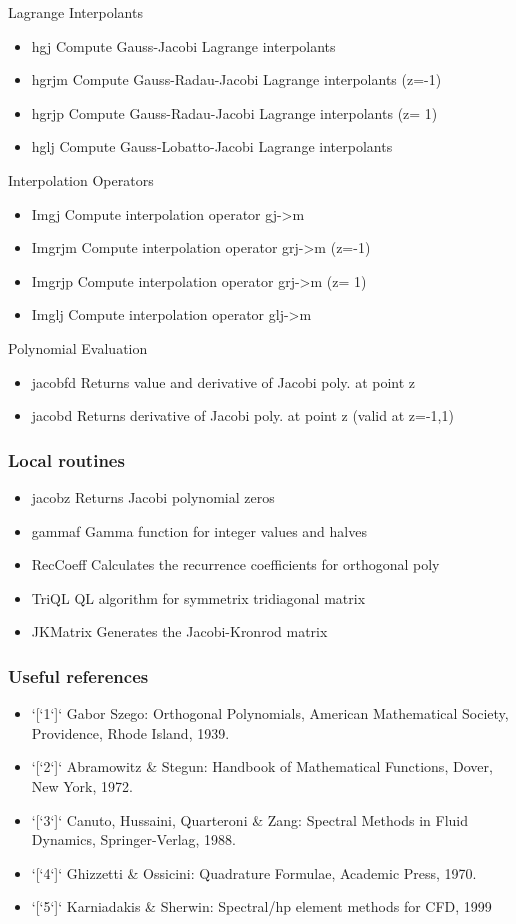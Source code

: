 Lagrange Interpolants
\begin{itemize}
\item hgj Compute Gauss-Jacobi Lagrange interpolants
\item hgrjm Compute Gauss-Radau-Jacobi Lagrange interpolants (z=-1)
\item hgrjp Compute Gauss-Radau-Jacobi Lagrange interpolants (z= 1)
\item hglj Compute Gauss-Lobatto-Jacobi Lagrange interpolants
\end{itemize}

Interpolation Operators
\begin{itemize}
\item Imgj Compute interpolation operator gj->m
\item Imgrjm Compute interpolation operator grj->m (z=-1)
\item Imgrjp Compute interpolation operator grj->m (z= 1)
\item Imglj Compute interpolation operator glj->m
\end{itemize}

Polynomial Evaluation
\begin{itemize}
\item jacobfd Returns value and derivative of Jacobi poly. at point z
\item jacobd Returns derivative of Jacobi poly. at point z (valid at z=-1,1)
\end{itemize}

\subsubsection{Local routines}
\begin{itemize}
\item jacobz Returns Jacobi polynomial zeros
\item gammaf Gamma function for integer values and halves
\item RecCoeff Calculates the recurrence coefficients for orthogonal poly
\item TriQL QL algorithm for symmetrix tridiagonal matrix
\item JKMatrix Generates the Jacobi-Kronrod matrix
\end{itemize}

\subsubsection{Useful references}
\begin{itemize}
\item `[`1`]` Gabor Szego: Orthogonal Polynomials, American Mathematical
Society, Providence, Rhode Island, 1939.
\item `[`2`]` Abramowitz \& Stegun: Handbook of Mathematical Functions, Dover,
New York, 1972.
\item `[`3`]` Canuto, Hussaini, Quarteroni \& Zang: Spectral Methods in Fluid
 Dynamics, Springer-Verlag, 1988.
\item `[`4`]` Ghizzetti \& Ossicini: Quadrature Formulae, Academic Press, 1970.
\item `[`5`]` Karniadakis \& Sherwin: Spectral/hp element methods for CFD, 1999
\end{itemize}

